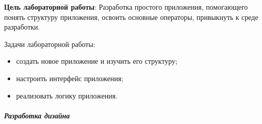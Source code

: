\documentclass[12pt, a4paper, simple]{eskdtext}
\begin{document}
    
    \textbf{Цель лабораторной работы}: Разработка простого приложения, помогающего понять структуру приложения,
    освоить основные операторы, привыкнуть к среде разработки.

    Задачи лабораторной работы:
    \begin{itemize}
        \item создать новое приложение и изучить его структуру;
        \item настроить интерфейс приложения;
        \item реализовать логику приложения.
    \end{itemize}

    \subparagraph{Разработка дизайна} \hspace{0pt}
\end{document}
